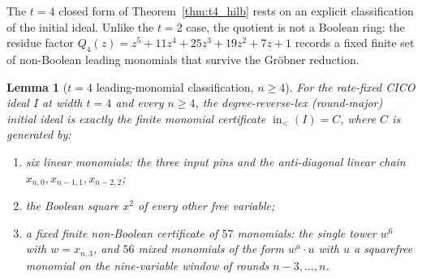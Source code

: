 \documentclass[11pt,a4paper]{article}
\newtheorem{lemma}[theorem]{Lemma}
\theoremstyle{definition}
\begin{document}
The $t = 4$ closed form of Theorem~\ref{thm:t4_hilb} rests on an
explicit classification of the initial ideal. Unlike the $t = 2$ case,
the quotient is not a Boolean ring: the residue factor $Q_4(z) =
z^5 + 11 z^4 + 25 z^3 + 19 z^2 + 7 z + 1$ records a fixed finite set of
non-Boolean leading monomials that survive the Gr\"obner reduction.

\begin{lemma}[$t = 4$ leading-monomial classification, $n \ge 4$]\label{lem:t4_lm_classification}
For the rate-fixed CICO ideal $I$ at width $t = 4$ and every $n \ge 4$,
the degree-reverse-lex (round-major) initial ideal is exactly the
finite monomial certificate
$\operatorname{in}_<(I) = C$, where $C$ is generated by:
\begin{enumerate}[nosep]
  \item[(a)] six \emph{linear} monomials: the three input pins and the
    anti-diagonal linear chain $x_{n,0}, x_{n-1,1}, x_{n-2,2}$;
  \item[(b)] the \emph{Boolean square} $x^2$ of every other free
    variable;
  \item[(c)] a fixed finite \emph{non-Boolean certificate} of $57$
    monomials: the single tower $w^6$ with $w = x_{n,3}$, and $56$
    mixed monomials of the form $w^a \cdot u$ with $u$ a squarefree
    monomial on the nine-variable window of rounds $n-3, \ldots, n$.
\end{enumerate}
\end{lemma}
\end{document}
